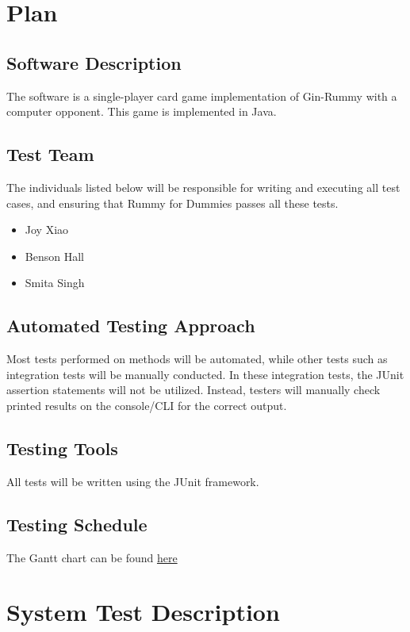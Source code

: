 \documentclass[12pt, titlepage]{article}
\begin{document}
\section{Plan}
\subsection{Software Description}
The software is a single-player card game implementation of Gin-Rummy with a computer opponent. This game is implemented in Java.

\subsection{Test Team}
The individuals listed below will be responsible for writing and executing all test cases, and ensuring that Rummy for Dummies passes all these tests.
\begin{itemize}
    \item Joy Xiao
    \item Benson Hall
    \item Smita Singh
\end{itemize}

\subsection{Automated Testing Approach}
Most tests performed on methods will be automated, while other tests such as integration tests will be manually conducted. In these integration tests, the JUnit assertion statements will not be utilized. Instead, testers will manually check printed results on the console/CLI for the correct output.

\subsection{Testing Tools}
All tests will be written using the JUnit framework. 

\subsection{Testing Schedule}
		
The Gantt chart can be found \href{https://gitlab.cas.mcmaster.ca/xiaoz18/3xa3-project/-/blob/master/ProjectSchedule/3XA3-project.gan}{here}

\section{System Test Description}
	
\end{document}
